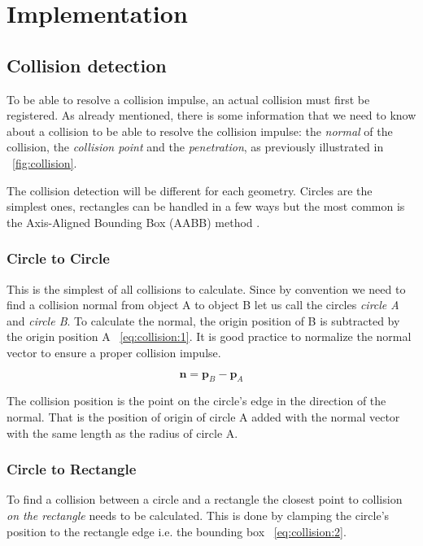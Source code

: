 \documentclass[a4paper,12pt]{report}
\begin{document}
\chapter{Implementation}

\section{Collision detection}

To be able to resolve a collision impulse, an actual collision must first be registered. As already mentioned, there is some information that we need to know about a collision to be able to resolve the collision impulse: the \emph{normal} of the collision, the \emph{collision point} and the \emph{penetration}, as previously illustrated in ~\ref{fig:collision}.

The collision detection will be different for each geometry. Circles are the simplest ones, rectangles can be handled in a few ways but the most common is the Axis-Aligned Bounding Box (AABB) method \cite{aabb}.

\subsection{Circle to Circle}

This is the simplest of all collisions to calculate. Since by convention we need to find a collision normal from object A to object B let us call the circles \emph{circle A} and \emph{circle B}. To calculate the normal, the origin position of B is subtracted by the origin position A ~\eqref{eq:collision:1}. It is good practice to normalize the normal vector to ensure a proper collision impulse.

\begin{equation}
\mathbf n=\mathbf p_{B}-\mathbf p_{A}
\label{eq:collision:1}
\end{equation}

The collision position is the point on the circle's edge in the direction of the normal. That is the position of origin of circle A added with the normal vector with the same length as the radius of circle A.

\subsection{Circle to Rectangle}

To find a collision between a circle and a rectangle the closest point to collision \emph{on the rectangle} needs to be calculated. This is done by clamping the circle's position to the rectangle edge i.e. the bounding box ~\eqref{eq:collision:2}.
\end{document}
